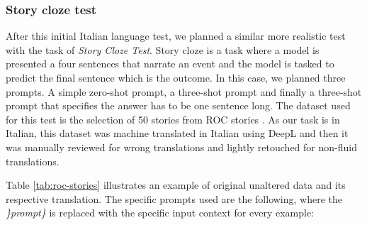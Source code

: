 \subsubsection{Story cloze test}
After this initial Italian language test, we planned a similar more realistic test with the task of \emph{Story Cloze Test}. Story cloze is a task where a model is presented a four sentences that narrate an event and the model is tasked to predict the final sentence which is the outcome. In this case, we planned three prompts. A simple zero-shot prompt, a three-shot prompt and finally a three-shot prompt that specifies the answer has to be one sentence long. The dataset used for this test is the selection of 50 stories from ROC stories \cite{mostafazadeh2016corpus}. As our task is in Italian, this dataset was machine translated in Italian using DeepL \cite{} and then it was manually reviewed for wrong translations and lightly retouched for non-fluid translations. 

Table \ref{tab:roc-stories} illustrates an example of original unaltered data and its respective translation.
The specific prompts used are the following, where the \emph{\}prompt\}} is replaced with the specific input context for every example:
